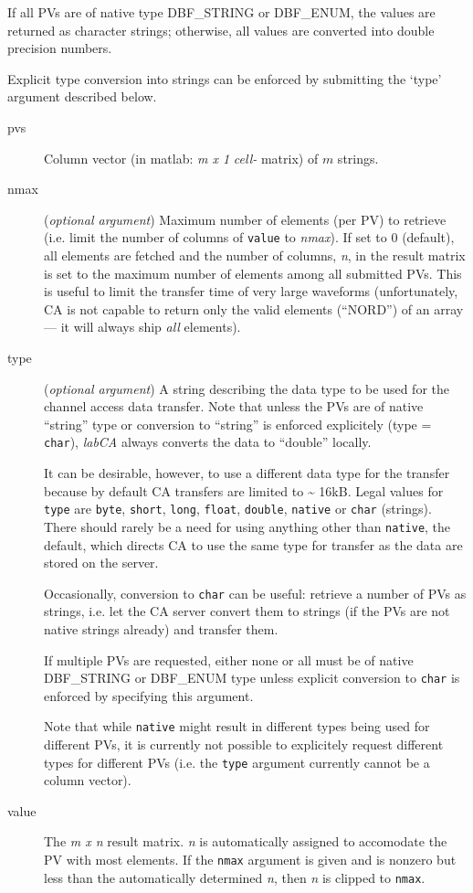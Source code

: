 \documentclass{article}
\newcommand{\sca}{\ita{labCA}}
\newcommand{\com}[1]{{\tt #1}}
\newcommand{\ita}[1]{\emph{#1}}
\newcommand{\m}{$m$}
\newcommand{\mhack}{$m$} %
\newcommand{\n}{$n$}
\newcommand{\mxn}{$m\times n$}
\newcommand{\mxl}{$m\times 1$}
\newcommand{\calimit}{$\approx 16$kB}
\renewcommand{\m}{\ita{m}}
\newcommand{\mhack}{\ita{m}} %
\renewcommand{\n}{\ita{n}}
\renewcommand{\mxn}{\ita{m x n}}
\renewcommand{\mxl}{\ita{m x 1}}
\renewcommand{\calimit}{\~{} 16kB}
\newcommand{\PVITEM}{
\item[pvs] Column vector (in matlab: \mxl{} \ita{cell-} matrix)
of \mhack{} strings.
}
\begin{document}
If all PVs are of native type DBF\_STRING or DBF\_ENUM, the
values are returned as character strings; otherwise,
all values are converted into double precision numbers.

Explicit type conversion into strings can be enforced by submitting
the `type' argument described below.

\begin{description}
\PVITEM
%
%
\item[nmax] (\ita{optional argument}) Maximum number of elements
(per PV) to retrieve (i.e. limit the number of columns of \com{value} to
\ita{nmax}).
If set to 0 (default), all elements are fetched
and the number of columns, \n, in the result matrix is set to the
maximum number of elements among all submitted PVs. This is useful
to limit the transfer time of very large waveforms (unfortunately,
CA is not capable to return only the valid elements (``NORD'') of
an array --- it will always ship \ita{all} elements).
%
%
\item[type] (\ita{optional argument}) A string describing the
data type to be used for the channel access data transfer. Note
that unless the PVs are of native ``string'' type or conversion to
``string'' is enforced explicitely (type = \com{char}), \sca{}
always converts the data to ``double'' locally.

It can be desirable, however, to use a different data type for the
transfer because by default CA transfers are limited to \calimit.
Legal values for \com{type}{} are \com{byte}, \com{short}, \com{long},
\com{float}, \com{double}, \com{native} or \com{char} (strings).
There should rarely be a need for using anything other than \com{native},
the default, which directs CA to use the same type for transfer as the
data are stored on the server.

Occasionally, conversion to \com{char} can be useful: retrieve a number
of PVs as strings, i.e. let the CA server convert them to strings
(if the PVs are not native strings already) and transfer them.

If multiple PVs are requested, either none or all must be of native
DBF\_STRING or DBF\_ENUM type unless explicit conversion to \com{char}
is enforced by specifying this argument.

Note that while \com{native}{} might result in different types
being used for different PVs, it is currently not possible to
explicitely request different types for different PVs (i.e. the
\com{type}{} argument currently cannot be a column vector).
%
%
\item[value] The \mxn{} result matrix. \n{} is automatically
assigned to accomodate the PV with most elements. If the \com{nmax}{}
argument is given and is nonzero but less than the automatically
determined \n, then \n{} is clipped to \com{nmax}.


\end{description}
\end{document}
